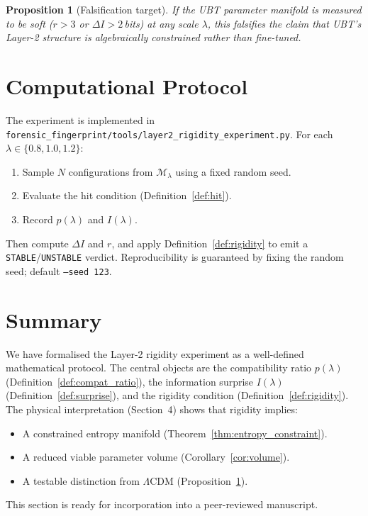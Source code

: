 \documentclass[12pt]{article}
\newtheorem{proposition}{Proposition}[section]
\newcommand{\calM}{\mathcal{M}}
\begin{document}
\begin{proposition}[Falsification target]
\label{prop:falsif}
If the UBT parameter manifold is measured to be \emph{soft} ($r>3$ or $\Delta I>2$\,bits)
at any scale $\lambda$, this falsifies the claim that UBT's Layer-2 structure is
algebraically constrained rather than fine-tuned.
\end{proposition}

\section{Computational Protocol}

The experiment is implemented in
\texttt{forensic\_fingerprint/tools/layer2\_rigidity\_experiment.py}.
For each $\lambda\in\{0.8, 1.0, 1.2\}$:
\begin{enumerate}
  \item Sample $N$ configurations from $\calM_\lambda$ using a fixed random seed.
  \item Evaluate the hit condition (Definition~\ref{def:hit}).
  \item Record $p(\lambda)$ and $I(\lambda)$.
\end{enumerate}
Then compute $\Delta I$ and $r$, and apply Definition~\ref{def:rigidity} to emit
a \texttt{STABLE}/\texttt{UNSTABLE} verdict.  Reproducibility is guaranteed by
fixing the random seed; default \texttt{--seed~123}.

\section{Summary}

We have formalised the Layer-2 rigidity experiment as a well-defined mathematical
protocol.  The central objects are the compatibility ratio $p(\lambda)$
(Definition~\ref{def:compat_ratio}), the information surprise $I(\lambda)$
(Definition~\ref{def:surprise}), and the rigidity condition (Definition~\ref{def:rigidity}).
The physical interpretation (Section~4) shows that rigidity implies:
\begin{itemize}
  \item A constrained entropy manifold (Theorem~\ref{thm:entropy_constraint}).
  \item A reduced viable parameter volume (Corollary~\ref{cor:volume}).
  \item A testable distinction from $\Lambda$CDM (Proposition~\ref{prop:falsif}).
\end{itemize}
This section is ready for incorporation into a peer-reviewed manuscript.
\end{document}
